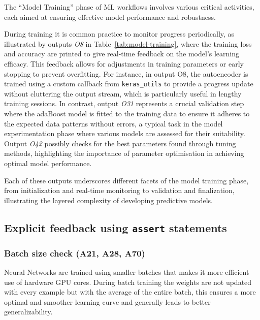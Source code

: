 The ``Model Training'' phase of ML workflows involves various critical activities, each aimed at ensuring effective model performance and robustness.

During training it is common practice to monitor progress periodically, as illustrated by outputs \emph{O8} in Table~\ref{tab:model-training}, where the training loss and accuracy are printed to give real-time feedback on the model's learning efficacy. This feedback allows for adjustments in training parameters or early stopping to prevent overfitting. For instance, in output O8, the autoencoder is trained using a custom callback from \texttt{keras\_utils} to provide a progress update without cluttering the output stream, which is particularly useful in lengthy training sessions. In contrast, output \emph{O31} represents a crucial validation step where the adaBoost model is fitted to the training data to ensure it adheres to the expected data patterns without errors, a typical task in the model experimentation phase where various models are assessed for their suitability. Output \emph{O42} possibly checks for the best parameters found through tuning methods, highlighting the importance of parameter optimisation in achieving optimal model performance.

Each of these outputs underscores different facets of the model training phase, from initialization and real-time monitoring to validation and finalization, illustrating the layered complexity of developing predictive models.

\subsection{Explicit feedback using \texttt{assert} statements}


\subsubsection{Batch size check (A21, A28, A70)}

Neural Networks are trained using smaller batches that makes it more efficient use of hardware GPU cores. During batch training the weights are not updated with every example but with the average of the entire batch, this ensures a more optimal and smoother learning curve and generally leads to better generalizability.

